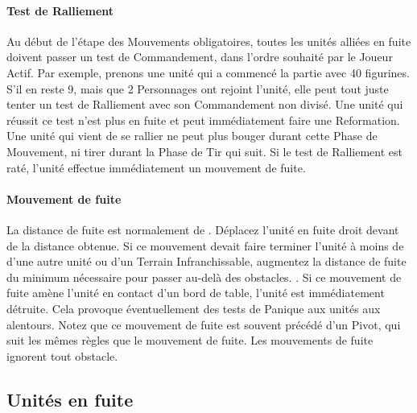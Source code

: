 \paragraph{Test de Ralliement}

Au début de l'étape des Mouvements obligatoires, toutes les unités alliées en fuite doivent passer un test de Commandement, dans l'ordre souhaité par le Joueur Actif.  Par exemple, prenons une unité qui a commencé la partie avec 40 figurines. S'il en reste 9, mais que 2 Personnages ont rejoint l'unité, elle peut tout juste tenter un test de Ralliement avec son Commandement non divisé. Une unité qui réussit ce test n'est plus en fuite et peut immédiatement faire une Reformation. Une unité qui vient de se rallier ne peut plus bouger durant cette Phase de Mouvement, ni tirer durant la Phase de Tir qui suit. Si le test de Ralliement est raté, l'unité effectue immédiatement un mouvement de fuite.

\paragraph{Mouvement de fuite}

La distance de fuite est normalement de . Déplacez l'unité en fuite droit devant de la distance obtenue. Si ce mouvement devait faire terminer l'unité à moins de  d'une autre unité ou d'un Terrain Infranchissable, augmentez la distance de fuite du minimum nécessaire pour passer au-delà des obstacles. . Si ce mouvement de fuite amène l'unité en contact d'un bord de table, l'unité est immédiatement détruite. Cela provoque éventuellement des tests de Panique aux unités aux alentours. Notez que ce mouvement de fuite est souvent précédé d'un Pivot, qui suit les mêmes règles que le mouvement de fuite. Les mouvements de fuite ignorent tout obstacle.

\subsection{Unités en fuite}

